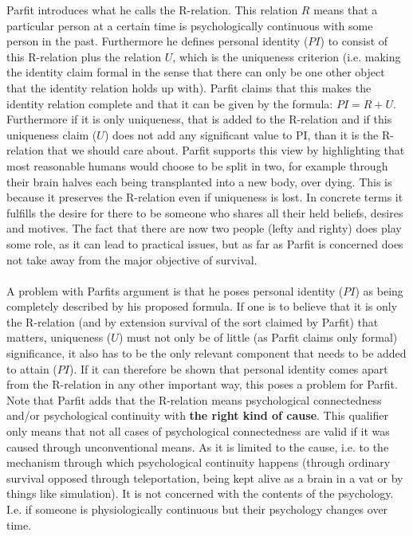 \documentclass[14pt]{article}
\begin{document}
Parfit introduces what he calls the R-relation. This relation $R$ means that a particular person at a certain time is psychologically
continuous with some person in the past\autocite[262]{parfit}. Furthermore he defines personal identity ($PI$) to consist of this R-relation plus the relation
$U$, which is the uniqueness criterion (i.e. making the identity claim formal in the sense that there can only be one other
object that the identity relation holds up with). Parfit claims that this makes the identity relation complete and that it can be given by
the formula: $PI = R + U$\autocite[263]{parfit}. Furthermore if it is only uniqueness, that is added to the R-relation and if
this uniqueness claim ($U$) does not add any significant value to PI, than it is the R-relation that we should care about. Parfit supports this view
by highlighting that most reasonable humans would choose to be split in two, for example through their brain halves each being transplanted into a new body, over
dying\autocite[264]{parfit}. This is because it preserves the R-relation even if uniqueness is lost. In concrete terms it fulfills the desire for there to be
someone who shares all their held beliefs, desires and motives. The fact that there are now two people (lefty and righty) does play some role, as it can
lead to practical issues, but as far as Parfit is concerned does not take away from the major objective of survival.\\
\\
A problem with Parfits argument is that he poses personal identity ($PI$) as being completely described by his proposed formula. If one is to believe that
it is only the R-relation (and by extension survival of the sort claimed by Parfit) that matters, uniqueness ($U$) must not only be of little (as Parfit
claims only formal) significance, it also has to be the only relevant component that needs to be added to attain ($PI$). If it can therefore be shown that
personal identity comes apart from the R-relation in any other important way, this poses a problem for Parfit. 
Note that Parfit adds that the R-relation means psychological connectedness and/or psychological continuity with \textbf{the right kind of cause}. This qualifier only means
that not all cases of psychological connectedness are valid if it was caused through unconventional means. As it is limited to the cause, i.e. to
the mechanism through which psychological continuity happens (through ordinary survival opposed through teleportation, being kept alive as a brain in a vat or by
things like simulation). It is not concerned with the contents of the psychology. I.e. if someone is physiologically continuous but their psychology changes over time.\\ 
\end{document}
